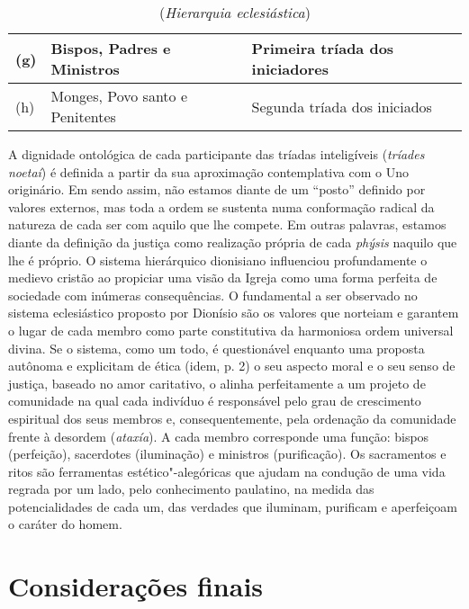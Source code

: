 {\begin{table}[h]
\caption{(\emph{Hierarquia eclesiástica})}

\begin{tabular}{lll}
(g) &Bispos, Padres e Ministros & Primeira tríada dos iniciadores\\\hline
(h) &Monges, Povo santo e Penitentes & Segunda tríada dos iniciados
\end{tabular}
\end{table}

A dignidade ontológica de cada participante das tríadas inteligíveis
(\emph{tríades noetaí}) é definida a partir da sua aproximação
contemplativa com o Uno originário. Em sendo assim, não estamos diante
de um “posto” definido por valores externos, mas toda a ordem se
sustenta numa conformação radical da natureza de cada ser com aquilo
que lhe compete. Em outras palavras, estamos diante da definição da
justiça como realização própria de cada \emph{phýsis} naquilo que lhe
é próprio. O sistema hierárquico dionisiano influenciou profundamente o
medievo cristão ao propiciar uma visão da Igreja como uma forma
perfeita de sociedade com inúmeras consequências. O fundamental a ser
observado no sistema eclesiástico proposto por Dionísio são os valores
que norteiam e garantem o lugar de cada membro como parte constitutiva
da harmoniosa ordem universal divina. Se o sistema, como um todo, é
questionável enquanto uma proposta autônoma e explicitam de ética (idem,
p. 2) o seu aspecto moral e o seu senso de justiça, baseado no amor
caritativo, o alinha perfeitamente a um projeto de comunidade na qual
cada indivíduo é responsável pelo grau de crescimento espiritual dos
seus membros e, consequentemente, pela ordenação da comunidade frente à
desordem (\emph{ataxía}). A cada membro corresponde uma função:
bispos (perfeição), sacerdotes (iluminação) e ministros (purificação).
Os sacramentos e ritos são ferramentas estético"-alegóricas que ajudam
na condução de uma vida regrada por um lado, pelo conhecimento
paulatino, na medida das potencialidades de cada um, das verdades que
iluminam, purificam e aperfeiçoam o caráter do homem.

\section{Considerações finais}

}
